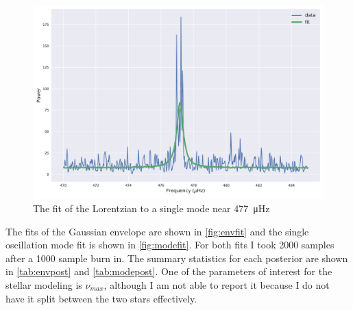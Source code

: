 \documentclass[
    aip,
    jmp,
    reprint,
    nofootinbib,
    floatfix
    ]{revtex4-1}
\begin{document}
    \begin{figure}[th]
        \centering
        \includegraphics[width=\linewidth]{../figs/mode_fit}
        \caption{The fit of the Lorentzian to a single mode near \SI{477}{\micro Hz}}
        \label{fig:modefit}
    \end{figure}

    The fits of the Gaussian envelope are shown in \autoref{fig:envfit} and the single oscillation mode fit is shown in \autoref{fig:modefit}. For both fits I took 2000 samples after a 1000 sample burn in. The summary statistics for each posterior are shown in \autoref{tab:envpost} and \autoref{tab:modepost}. One of the parameters of interest for the stellar modeling is $\nu_{max}$, although I am not able to report it because I do not have it split between the two stars effectively. 
\end{document}
